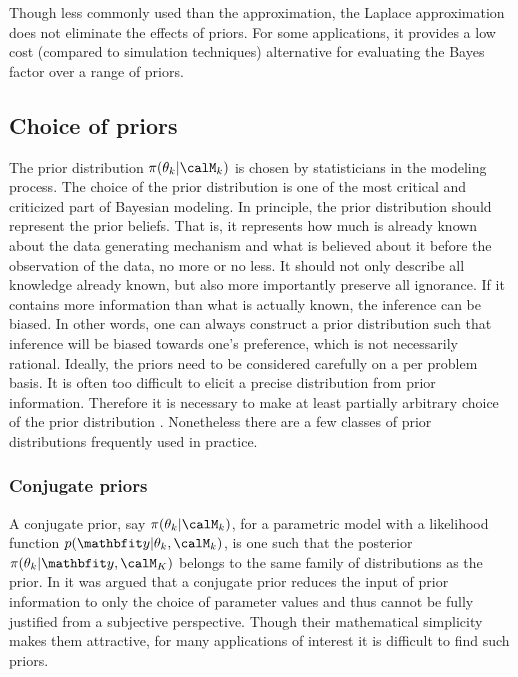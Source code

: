 Though less commonly used than the \bic approximation, the Laplace approximation does not eliminate the effects of priors. For some applications, it provides a low cost (compared to simulation techniques) alternative for evaluating the Bayes factor over a range of priors.

\subsection{Choice of priors}
\label{sub:Choice of priors}

The prior distribution $\pi(\theta_k|\calM_k)$ is chosen by statisticians in the modeling process. The choice of the prior distribution is one of the most critical and criticized part of Bayesian modeling. In principle, the prior distribution should represent the prior beliefs. That is, it represents how much is already known about the data generating mechanism and what is believed about it before the observation of the data, no more or no less. It should not only describe all knowledge already known, but also more importantly preserve all ignorance. If it contains more information than what is actually known, the inference can be biased. In other words, one can always construct a prior distribution such that inference will be biased towards one's preference, which is not necessarily rational. Ideally, the priors need to be considered carefully on a per problem basis. It is often too difficult to elicit a precise distribution from prior information. Therefore it is necessary to make at least partially arbitrary choice of the prior distribution \cite[][chap.~3]{Robert:2007tc}\cite{Kass:1995vb}. Nonetheless there are a few classes of prior distributions frequently used in practice.

\subsubsection{Conjugate priors}
\label{ssub:Conjugate priors}

A conjugate prior, say $\pi(\theta_k|\calM_k)$, for a parametric model with a likelihood function $p(\data|\theta_k,\calM_k)$, is one such that the posterior $\pi(\theta_k|\data,\calM_K)$ belongs to the same family of distributions as the prior. In \cite[][sec.~5.2]{Bernardo:1994vd} it was argued that a conjugate prior reduces the input of prior information to only the choice of parameter values and thus cannot be fully justified from a subjective perspective. Though their mathematical simplicity makes them attractive, for many applications of interest it is difficult to find such priors.

